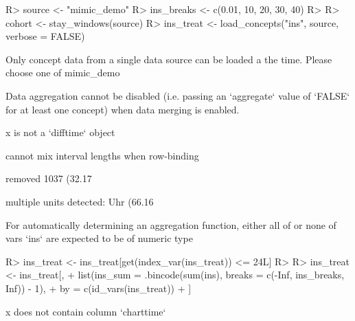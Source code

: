 \documentclass[
]{jss}
\begin{document}
\begin{CodeChunk}

\begin{CodeInput}
R> source <- "mimic_demo"
R> ins_breaks <- c(0.01, 10, 20, 30, 40)
R> 
R> cohort <- stay_windows(source)
R> ins_treat <- load_concepts("ins", source, verbose = FALSE)
\end{CodeInput}

\begin{CodeOutput}
Only concept data from a single data source can be loaded a the time. Please
choose one of mimic_demo
\end{CodeOutput}

\begin{CodeOutput}
Data aggregation cannot be disabled (i.e. passing an `aggregate` value of
`FALSE` for at least one concept) when data merging is enabled.
\end{CodeOutput}

\begin{CodeOutput}
x is not a `difftime` object
\end{CodeOutput}

\begin{CodeOutput}
cannot mix interval lengths when row-binding
\end{CodeOutput}

\begin{CodeOutput}
removed 1037 (32.17%
\end{CodeOutput}

\begin{CodeOutput}
multiple units detected: Uhr (66.16%
\end{CodeOutput}

\begin{CodeOutput}
For automatically determining an aggregation function, either all of or none of
vars `ins` are expected to be of numeric type
\end{CodeOutput}

\begin{CodeInput}
R> ins_treat <- ins_treat[get(index_var(ins_treat)) <= 24L]
R> 
R> ins_treat <- ins_treat[,
+   list(ins_sum = .bincode(sum(ins), breaks = c(-Inf, ins_breaks, Inf)) - 1),
+   by = c(id_vars(ins_treat))
+ ]
\end{CodeInput}

\begin{CodeOutput}
x does not contain column `charttime`
\end{CodeOutput}


\end{CodeChunk}
\end{document}
